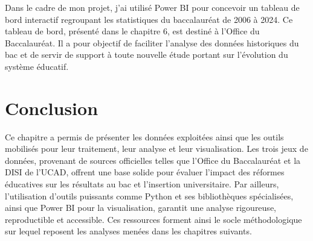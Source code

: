 Dans le cadre de mon projet, j’ai utilisé Power BI pour concevoir un tableau de bord interactif regroupant les statistiques du baccalauréat de 2006 à 2024. 
Ce tableau de bord, présenté dans le chapitre 6, est destiné à l’Office du Baccalauréat. Il a pour objectif de faciliter l’analyse des données historiques du bac et de servir de support à toute nouvelle étude portant sur l’évolution du système éducatif.

\section{Conclusion}

Ce chapitre a permis de présenter les données exploitées ainsi que les outils mobilisés pour leur traitement, leur analyse et leur visualisation. 
Les trois jeux de données, provenant de sources officielles telles que l’Office du Baccalauréat et la DISI de l’UCAD, 
offrent une base solide pour évaluer l’impact des réformes éducatives sur les résultats au bac et l’insertion universitaire. 
Par ailleurs, l’utilisation d’outils puissants comme Python et ses bibliothèques spécialisées, ainsi que Power BI pour la visualisation, 
garantit une analyse rigoureuse, reproductible et accessible. Ces ressources forment ainsi le socle méthodologique sur lequel reposent les analyses menées dans les chapitres suivants.